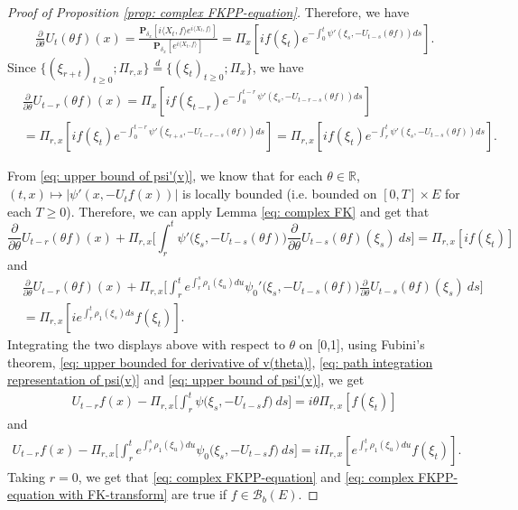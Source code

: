 \documentclass[12pt,a4paper]{amsart}
\theoremstyle{plain}
\theoremstyle{definition}
\numberwithin{equation}{section}
\begin{document}
\begin{proof}[Proof of Proposition \ref{prop: complex FKPP-equation}]
  Therefore, we have
  \begin{align}
    \frac{\partial}{\partial \theta} {U_t(\theta f)(x)}
    = \frac{\mathbf P_{\delta_x}[i\langle X_t, f\rangle e^{i \langle X_t, f\rangle}] }{\mathbf P_{\delta_x}[e^{i \langle X_t, f\rangle}]}
    = \Pi_x[ if(\xi_t) e^{ - \int_0^t \psi'(\xi_s, -U_{t-s}(\theta f)) ds} ].
  \end{align}
  Since $\{(\xi_{r+t})_{t \geq 0}; \Pi_{r,x}\} \overset{d}{=} \{(\xi_{t})_{t\geq 0}; \Pi_{x}\} $, we have
  \begin{align}
    & \frac{\partial}{\partial \theta} U_{t-r}(\theta f)( x)
      = \Pi_x[ i f(\xi_{t-r}) e^{-\int_0^{t-r} \psi'(\xi_s, -U_{t-r-s}(\theta f)) ds} ] \\
    & = \Pi_{r,x}[i f(\xi_t)e^{-\int_0^{t-r} \psi'(\xi_{r+s}, -U_{t-r-s}(\theta f)) ds} ]
      = \Pi_{r,x}[if(\xi_t)e^{-\int_r^t \psi'(\xi_{s}, -U_{t-s}(\theta f)) ds} ].
  \end{align}
  
  From \eqref{eq: upper bound of psi'(v)}, we know that for each $\theta\in \mathbb R$, $(t,x) \mapsto |\psi'(x,-U_tf(x))|$ is locally bounded (i.e. bounded on $[0,T]\times E$ for each $T \geq 0$).
  Therefore, we can apply Lemma \ref{eq: complex FK} and get that
  \[
    \frac{\partial}{\partial \theta} U_{t-r}(\theta f)(x) + \Pi_{r,x} \Big[\int_r^t \psi'\big(\xi_s,- U_{t-s}(\theta f)\big)\frac{\partial}{\partial \theta} U_{t-s}(\theta f)(\xi_s)~ds\Big]
    = \Pi_{r,x} [i f(\xi_t)]
  \]
  and
  \begin{align}
    & \frac{\partial}{\partial \theta} U_{t-r}(\theta f)(x) + \Pi_{r,x} \Big[\int_r^t e^{\int_r^s \rho_1(\xi_u)du}\psi_0'\big(\xi_s,- U_{t-s}(\theta f)\big)\frac{\partial}{\partial \theta} U_{t-s}(\theta f)(\xi_s)~ds\Big]\\
    & = \Pi_{r,x} [i e^{\int_r^t \rho_1(\xi_s)ds}f(\xi_t)].
  \end{align}
  Integrating the two displays above with respect to $\theta$  on [0,1], using
  Fubini's theorem, \eqref{eq: upper bounded for derivative of v(theta)}, \eqref{eq: path integration representation of psi(v)} and \eqref{eq: upper bound of psi'(v)}, we get
  \begin{align}
    U_{t-r}f(x) - \Pi_{r,x} \Big[\int_r^t \psi\big(\xi_s,-U_{t-s}f\big) ~ds\Big]
    = i \theta \Pi_{r,x} [f(\xi_t)]
  \end{align}
  and
  \begin{align}
    U_{t-r}f(x) - \Pi_{r,x} \Big[\int_r^t e^{\int_r^s \rho_1(\xi_u)du} \psi_0\big(\xi_s,- U_{t-s}f\big) ~ds\Big]
    = i \Pi_{r,x} [e^{\int_r^t\rho_1(\xi_u)du}f(\xi_t)].
  \end{align}
  Taking $r = 0$, we get that \eqref{eq: complex FKPP-equation} and \eqref{eq: complex FKPP-equation with FK-transform} are true if $f\in \mathcal B_b(E)$.


\end{proof}
\end{document}
